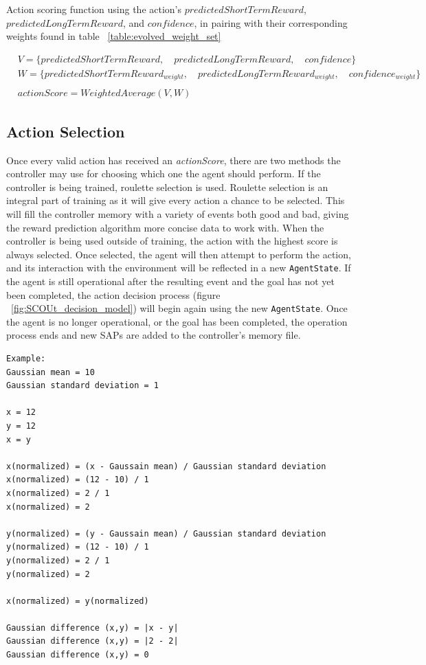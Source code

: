 \caption{Action scoring function using the action's $predictedShortTermReward$, $predictedLongTermReward$, and $confidence$, in pairing with their corresponding weights found in table ~\ref{table:evolved_weight_set}}
\begin{equation} \label{eq:action_score}
\begin{align}
  &V = \{predictedShortTermReward,\quad predictedLongTermReward,\quad confidence\} \\
  &W = \{predictedShortTermReward_{weight},\quad predictedLongTermReward_{weight},\quad confidence_{weight}\} \\
  &\\
  &actionScore = WeightedAverage(V,W)
\end{align}
\end{equation}


\subsection{Action Selection}
Once every valid action has received an \textit{actionScore}, there are two methods the controller may use for choosing which one the agent should perform.
If the controller is being trained, roulette selection is used.
Roulette selection is an integral part of training as it will give every action a chance to be selected.
This will fill the controller memory with a variety of events both good and bad, giving the reward prediction algorithm more concise data to work with.
When the controller is being used outside of training, the action with the highest score is always selected.
Once selected, the agent will then attempt to perform the action, and its interaction with the environment will be reflected in a new \texttt{AgentState}.
If the agent is still operational after the resulting event and the goal has not yet been completed, the action decision process (figure ~\ref{fig:SCOUt_decision_model}) will begin again using the new \texttt{AgentState}.
Once the agent is no longer operational, or the goal has been completed, the operation process ends and new SAPs are added to the controller's memory file.






\begin{lstlisting}[label=proof:gaussian_difference_identical]
Example:
Gaussian mean = 10
Gaussian standard deviation = 1

x = 12
y = 12
x = y

x(normalized) = (x - Gaussain mean) / Gaussian standard deviation
x(normalized) = (12 - 10) / 1
x(normalized) = 2 / 1
x(normalized) = 2

y(normalized) = (y - Gaussain mean) / Gaussian standard deviation
y(normalized) = (12 - 10) / 1
y(normalized) = 2 / 1
y(normalized) = 2

x(normalized) = y(normalized)

Gaussian difference (x,y) = |x - y|
Gaussian difference (x,y) = |2 - 2|
Gaussian difference (x,y) = 0
\end{lstlisting}


